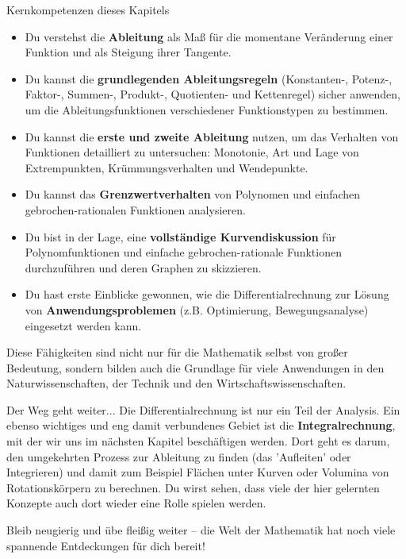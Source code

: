 \begin{merksatzumgebung}{Kernkompetenzen dieses Kapitels}
\begin{itemize}
    \item Du verstehst die \textbf{Ableitung} als Maß für die momentane Veränderung einer Funktion und als Steigung ihrer Tangente.
    \item Du kannst die \textbf{grundlegenden Ableitungsregeln} (Konstanten-, Potenz-, Faktor-, Summen-, Produkt-, Quotienten- und Kettenregel) sicher anwenden, um die Ableitungsfunktionen verschiedener Funktionstypen zu bestimmen.
    \item Du kannst die \textbf{erste und zweite Ableitung} nutzen, um das Verhalten von Funktionen detailliert zu untersuchen: Monotonie, Art und Lage von Extrempunkten, Krümmungsverhalten und Wendepunkte.
    \item Du kannst das \textbf{Grenzwertverhalten} von Polynomen und einfachen gebrochen-rationalen Funktionen analysieren.
    \item Du bist in der Lage, eine \textbf{vollständige Kurvendiskussion} für Polynomfunktionen und einfache gebrochen-rationale Funktionen durchzuführen und deren Graphen zu skizzieren.
    \item Du hast erste Einblicke gewonnen, wie die Differentialrechnung zur Lösung von \textbf{Anwendungsproblemen} (z.B. Optimierung, Bewegungsanalyse) eingesetzt werden kann.
\end{itemize}
Diese Fähigkeiten sind nicht nur für die Mathematik selbst von großer Bedeutung, sondern bilden auch die Grundlage für viele Anwendungen in den Naturwissenschaften, der Technik und den Wirtschaftswissenschaften.
\end{merksatzumgebung}

\begin{infoboxumgebung}{Der Weg geht weiter...}
Die Differentialrechnung ist nur ein Teil der Analysis. Ein ebenso wichtiges und eng damit verbundenes Gebiet ist die \textbf{Integralrechnung}, mit der wir uns im nächsten Kapitel beschäftigen werden. Dort geht es darum, den umgekehrten Prozess zur Ableitung zu finden (das 'Aufleiten' oder Integrieren) und damit zum Beispiel Flächen unter Kurven oder Volumina von Rotationskörpern zu berechnen. Du wirst sehen, dass viele der hier gelernten Konzepte auch dort wieder eine Rolle spielen werden.

Bleib neugierig und übe fleißig weiter – die Welt der Mathematik hat noch viele spannende Entdeckungen für dich bereit!
\end{infoboxumgebung}

